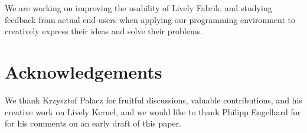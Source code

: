\documentclass[pdftex, times, 10pt, twocolumn]{article}
\begin{document}
We are working on improving the usability of Lively Fabrik, and studying feedback from actual end-users when applying our programming environment to creatively express their ideas and solve their problems. 



\section{Acknowledgements}
We thank Krzysztof Palacz for fruitful discussions, valuable contributions, and his creative work on Lively Kernel, and we would like to thank Philipp Engelhard for for his comments on an early draft of this paper.  

 



 
\end{document}
